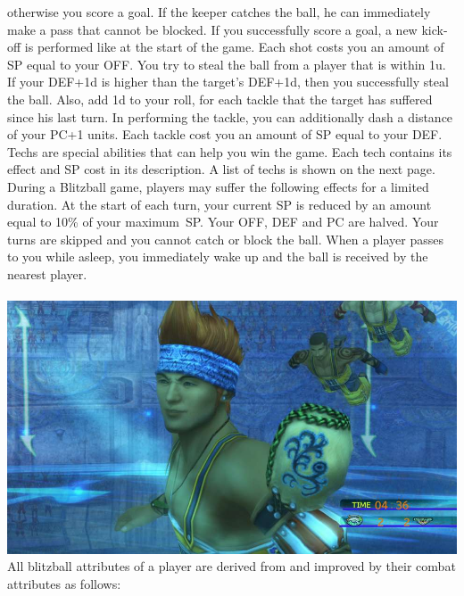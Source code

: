 otherwise you score a goal.
If the keeper catches the ball, he can immediately make a pass that cannot be blocked.
If you successfully score a goal, a new kick-off is performed like at the start of the game.
Each shot costs you an amount of SP equal to your OFF.
%	
\ofrow
%
 You try to steal the ball from a player that is within 1u.
If your DEF+1d is higher than the target's DEF+1d, then you successfully steal the ball.
Also, add 1d to your roll, for each tackle that the target has suffered since his last turn.
In performing the tackle, you can additionally dash a distance of your PC+1 units.
Each tackle cost you an amount of SP equal to your DEF.
%
\ofrow
%	
Techs are special abilities that can help you win the game.	
Each tech contains its effect and SP cost in its description.
A list of techs is shown on the next page.
%
\vfill
%
During a Blitzball game, players may suffer the following effects for a limited duration.\ofrow
{} At the start of each turn, your current SP is reduced by an amount equal to 10\% of your maximum~SP.\ofrow
{} Your OFF, DEF and PC are halved.\ofrow
{} Your turns are skipped and you cannot catch or block the ball.
When a player passes to you while asleep, you immediately wake up and the ball is received by the nearest player.
%
\clearpage
%
\\\\
%
\includegraphics[width=\columnwidth]{./art/blitz/ingame.jpg}
%
\vfill
%
All blitzball attributes of a player are derived from and improved by their combat attributes as follows: \ofrow
{} \ofrow
{} \ofrow
{} \ofrow
{} \ofrow
